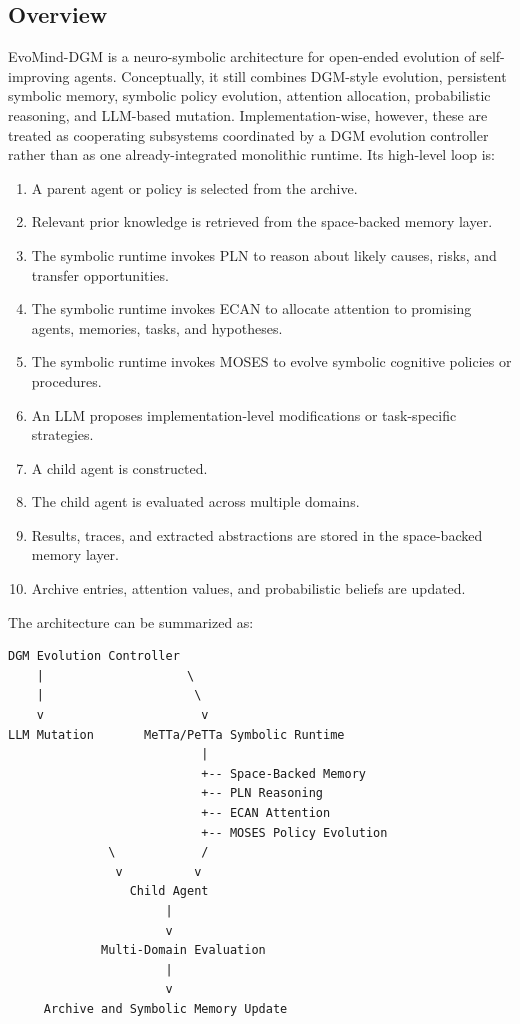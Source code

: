 \documentclass[11pt]{article}
\begin{document}
\subsection{Overview}

EvoMind-DGM is a neuro-symbolic architecture for open-ended evolution of self-improving agents. Conceptually, it still combines DGM-style evolution, persistent symbolic memory, symbolic policy evolution, attention allocation, probabilistic reasoning, and LLM-based mutation. Implementation-wise, however, these are treated as cooperating subsystems coordinated by a DGM evolution controller rather than as one already-integrated monolithic runtime. Its high-level loop is:

\begin{enumerate}[leftmargin=*]
    \item A parent agent or policy is selected from the archive.
    \item Relevant prior knowledge is retrieved from the space-backed memory layer.
    \item The symbolic runtime invokes PLN to reason about likely causes, risks, and transfer opportunities.
    \item The symbolic runtime invokes ECAN to allocate attention to promising agents, memories, tasks, and hypotheses.
    \item The symbolic runtime invokes MOSES to evolve symbolic cognitive policies or procedures.
    \item An LLM proposes implementation-level modifications or task-specific strategies.
    \item A child agent is constructed.
    \item The child agent is evaluated across multiple domains.
    \item Results, traces, and extracted abstractions are stored in the space-backed memory layer.
    \item Archive entries, attention values, and probabilistic beliefs are updated.
\end{enumerate}

The architecture can be summarized as:

\begin{verbatim}
DGM Evolution Controller
    |                    \
    |                     \
    v                      v
LLM Mutation       MeTTa/PeTTa Symbolic Runtime
                           |
                           +-- Space-Backed Memory
                           +-- PLN Reasoning
                           +-- ECAN Attention
                           +-- MOSES Policy Evolution
              \            /
               v          v
                 Child Agent
                      |
                      v
             Multi-Domain Evaluation
                      |
                      v
     Archive and Symbolic Memory Update
\end{verbatim}
\end{document}
